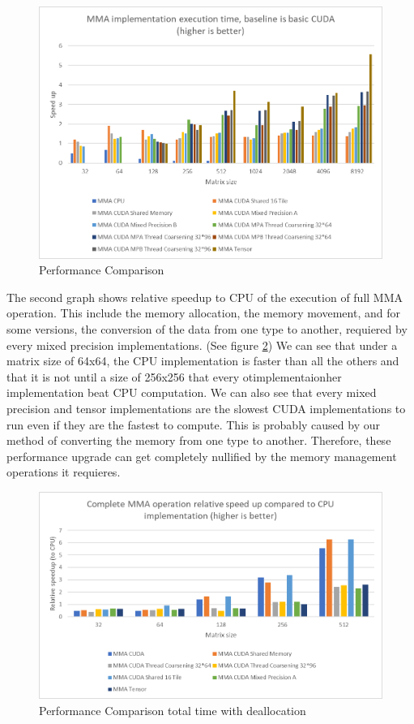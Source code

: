 \documentclass[conference]{IEEEtran}
\begin{document}
  \begin{figure}[h]
    \centering
    \includegraphics[scale=0.5]{figures/relative_speedup_3.png}
    \caption{Performance Comparison}
    \label{fig:performance-comparison}
  \end{figure}

  The second graph shows relative speedup to CPU of the execution of full MMA operation. 
  This include the memory allocation, the memory movement, and for some versions,
  the conversion of the data from one type to another, requiered by every mixed precision
  implementations. (See figure \ref{fig:time-comparison})
  We can see that under a matrix size of 64x64, the CPU implementation is faster than all the others
  and that it is not until a size of 256x256 that every otimplementaionher implementation beat CPU computation.
  We can also see that every mixed precision and tensor implementations are the slowest CUDA implementations
  to run even if they are the fastest to compute. This is probably caused by
  our method of converting the memory from one type to another. Therefore, these performance upgrade
  can get completely nullified by the memory management operations it requieres.


  \begin{figure}[h]
    \centering
    \includegraphics[scale=0.5]{figures/Tot_time_relative_speedup.png}
    \caption{Performance Comparison total time with deallocation}
    \label{fig:time-comparison}
  \end{figure}
  
\end{document}
